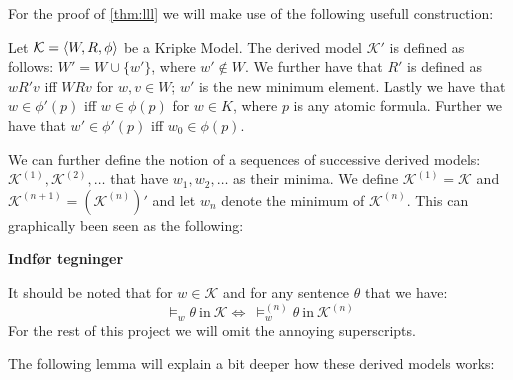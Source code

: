 \documentclass[../main.tex]{subfiles}
\begin{document}
For the proof of \ref{thm:lll} we will make use of the following usefull
construction:

\begin{defi}
	Let $\mathcal{K}=\langle W,R,\phi\rangle$ be a Kripke Model. The derived model
	$\mathcal{K'}$ is defined as follows: $W'=W\cup \{w'\}$, where
	$w'\not\in W$. We further have that $R'$ is defined as $wR'v$ iff $WRv$
	for $w,v\in W$; $w'$ is the new minimum element. Lastly we have that
	$w\in\phi'(p)$ iff $w\in\phi(p)$ for $w\in K$, where $p$ is any atomic
	formula. Further we have that $w'\in\phi'(p)$ iff $w_0\in\phi(p)$.
\end{defi}
We can further define the notion of a sequences of successive derived models:
$\mathcal{K}^{(1)},\mathcal{K}^{(2)},\ldots$ that have $w_1,w_2,\ldots$ as
their minima. We define $\mathcal{K}^{(1)}=\mathcal{K}$ and
$\mathcal{K}^{(n+1)}=(\mathcal{K}^{(n)})'$ and let $w_n$ denote the minimum of
$\mathcal{K}^{(n)}$. This can graphically been seen as the following:

\textbf{Indfør tegninger}

It should be noted that for $w\in\mathcal{K}$ and for any sentence $\theta$
that we have:
$$\vDash_w\theta\ \text{in}\ \mathcal{K}\Leftrightarrow\ \vDash_w^{(n)}\theta\
\text{in}\ \mathcal{K}^{(n)}$$
For the rest of this project we will omit the annoying superscripts.

The following lemma will explain a bit deeper how these derived models works:
\end{document}
